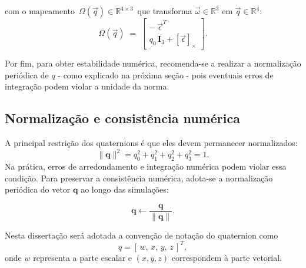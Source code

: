 com o mapeamento $\,\Omega(\vec{q})\in\mathbb{R}^{4\times 3}\,$ que transforma $\vec{\omega}\in\mathbb{R}^{3}$ em $\dot{\vec{q}}\in\mathbb{R}^{4}$:
\begin{equation}
    \Omega(\vec{q})
    \;=\;
    \begin{bmatrix}
        -\,\vec{\epsilon}^{T} \\[2pt]
        q_0\,\mathbf{I}_3 + [\vec{\epsilon}]_{\times}
    \end{bmatrix}.
    \label{eq:Omega_def}
\end{equation}


Por fim, para obter estabilidade numérica, recomenda-se a realizar a normalização periódica de $q$ - como explicado na próxima seção - pois eventuais erros de integração podem violar a unidade da norma.

\subsection{Normalização e consistência numérica}
A principal restrição dos quaternions é que eles devem permanecer normalizados:
\begin{equation}
\label{eq:normalizacao_quaternion}
\lVert \mathbf{q} \rVert^2 = q_0^2 + q_1^2 + q_2^2 + q_3^2 = 1.
\end{equation}
Na prática, erros de arredondamento e integração numérica podem violar essa condição. Para preservar a consistência numérica, adota-se a normalização periódica do vetor $\mathbf{q}$ ao longo das simulações:

\begin{equation}
    \mathbf{q} \leftarrow \frac{\mathbf{q}}{\lVert \mathbf{q} \rVert}.
\end{equation}

Nesta dissertação será adotada a convenção de notação do quaternion como
\begin{equation}
q = [\,w,\,x,\,y,\,z\,]^T,
\label{eq:quat_convencao}
\end{equation}
onde $w$ representa a parte escalar e $(x,y,z)$ correspondem à parte vetorial.

